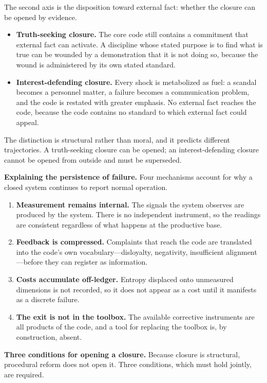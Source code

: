 \documentclass[11pt,a4paper]{article}
\begin{document}
The second axis is the disposition toward external fact: whether the closure can be opened by evidence.

\begin{itemize}
    \item \textbf{Truth-seeking closure.} The core code still contains a commitment that external fact can activate. A discipline whose stated purpose is to find what is true can be wounded by a demonstration that it is not doing so, because the wound is administered by its own stated standard.
    \item \textbf{Interest-defending closure.} Every shock is metabolized as fuel: a scandal becomes a personnel matter, a failure becomes a communication problem, and the code is restated with greater emphasis. No external fact reaches the code, because the code contains no standard to which external fact could appeal.
\end{itemize}

The distinction is structural rather than moral, and it predicts different trajectories. A truth-seeking closure can be opened; an interest-defending closure cannot be opened from outside and must be superseded.

\textbf{Explaining the persistence of failure.} Four mechanisms account for why a closed system continues to report normal operation.

\begin{enumerate}
    \item \textbf{Measurement remains internal.} The signals the system observes are produced by the system. There is no independent instrument, so the readings are consistent regardless of what happens at the productive base.
    \item \textbf{Feedback is compressed.} Complaints that reach the code are translated into the code's own vocabulary---disloyalty, negativity, insufficient alignment---before they can register as information.
    \item \textbf{Costs accumulate off-ledger.} Entropy displaced onto unmeasured dimensions is not recorded, so it does not appear as a cost until it manifests as a discrete failure.
    \item \textbf{The exit is not in the toolbox.} The available corrective instruments are all products of the code, and a tool for replacing the toolbox is, by construction, absent.
\end{enumerate}

\textbf{Three conditions for opening a closure.} Because closure is structural, procedural reform does not open it. Three conditions, which must hold jointly, are required.
\end{document}
